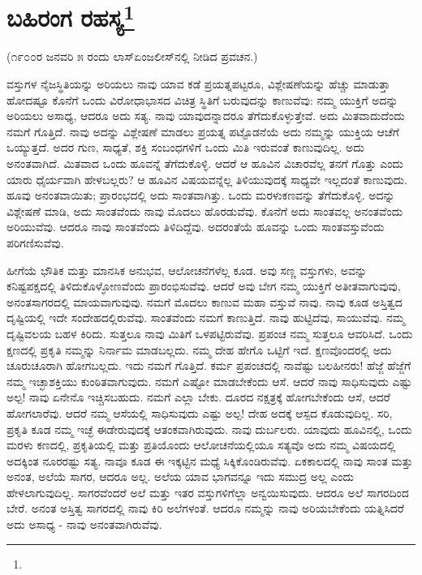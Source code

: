 
\chapter[ಬಹಿರಂಗ ರಹಸ್ಯ]{ಬಹಿರಂಗ ರಹಸ್ಯ\protect\footnote{}}

\begin{center}
(೧೯೦೦ರ ಜನವರಿ ೫ ರಂದು ಲಾಸ್‌ಏಂಜಲೀಸ್‌ನಲ್ಲಿ ನೀಡಿದ ಪ್ರವಚನ.)
\end{center}

ವಸ್ತುಗಳ ನೈಜಸ್ಥಿತಿಯನ್ನು ಅರಿಯಲು ನಾವು ಯಾವ ಕಡೆ ಪ್ರಯತ್ನಪಟ್ಟರೂ, ವಿಶ್ಲೇಷಣೆಯನ್ನು ಹೆಚ್ಚು ಮಾಡುತ್ತಾ ಹೋದಷ್ಟೂ ಕೊನೆಗೆ ಒಂದು ವಿರೋಧಾಭಾಸದ ವಿಚಿತ್ರ ಸ್ಥಿತಿಗೆ ಬರುವುದನ್ನು ಕಾಣುವೆವು: ನಮ್ಮ ಯುಕ್ತಿಗೆ ಅದನ್ನು ಅರಿಯಲು ಅಸಾಧ್ಯ, ಆದರೂ ಅದು ಸತ್ಯ. ನಾವು ಯಾವುದನ್ನಾದರೂ ತೆಗೆದುಕೊಳ್ಳುತ್ತೇವೆ. ಅದು ಮಿತವಾದುದೆಂದು ನಮಗೆ ಗೊತ್ತಿದೆ. ನಾವು ಅದನ್ನು ವಿಶ್ಲೇಷಣೆ ಮಾಡಲು ಪ್ರಯತ್ನ ಪಟ್ಟೊಡನೆಯೆ ಅದು ನಮ್ಮನ್ನು ಯುಕ್ತಿಯ ಆಚೆಗೆ ಒಯ್ಯುತ್ತದೆ. ಅದರ ಗುಣ, ಸಾಧ್ಯತೆ, ಶಕ್ತಿ ಸಂಬಂಧಗಳಿಗೆ ಒಂದು ಮಿತಿ ಇರುವಂತೆ ಕಾಣುವುದಿಲ್ಲ. ಅದು ಅನಂತವಾಗಿದೆ. ಮಿತವಾದ ಒಂದು ಹೂವನ್ನೆ ತೆಗೆದುಕೊಳ್ಳಿ. ಆದರೆ ಆ ಹೂವಿನ ವಿಚಾರವೆಲ್ಲ ತನಗೆ ಗೊತ್ತು ಎಂದು ಯಾರು ಧೈರ್ಯವಾಗಿ ಹೇಳಬಲ್ಲರು? ಆ ಹೂವಿನ ವಿಷಯವನ್ನೆಲ್ಲ ತಿಳಿಯುವುದಕ್ಕೆ ಸಾಧ್ಯವೇ ಇಲ್ಲದಂತೆ ಕಾಣುವುದು. ಹೂವು ಅನಂತವಾಯಿತು; ಪ್ರಾರಂಭದಲ್ಲಿ ಅದು ಸಾಂತವಾಗಿತ್ತು. ಒಂದು ಮರಳುಕಣವನ್ನು ತೆಗೆದುಕೊಳ್ಳಿ. ಅದನ್ನು ವಿಶ್ಲೇಷಣೆ ಮಾಡಿ, ಅದು ಸಾಂತವೆಂದು ನಾವು ಮೊದಲು ಹೊರಡುವೆವು. ಕೊನೆಗೆ ಅದು ಸಾಂತವಲ್ಲ ಅನಂತವೆಂದು ಅರಿಯುವೆವು. ಆದರೂ ನಾವು ಸಾಂತವೆಂದು ತಿಳಿದಿದ್ದೆವು. ಅದರಂತೆಯೆ ಹೂವನ್ನು ಒಂದು ಸಾಂತವಸ್ತುವೆಂದು ಪರಿಗಣಿಸುವೆವು.

ಹೀಗೆಯೆ ಭೌತಿಕ ಮತ್ತು ಮಾನಸಿಕ ಅನುಭವ, ಆಲೋಚನೆಗಳೆಲ್ಲ ಕೂಡ. ಅವು ಸಣ್ಣ ವಸ್ತುಗಳು, ಅವನ್ನು ಕನಿಷ್ಟಪಕ್ಷದಲ್ಲಿ ತಿಳಿದುಕೊಳ್ಳೋಣವೆಂದು ಪ್ರಾರಂಭಿಸುವೆವು. ಆದರೆ ಅವು ಬೇಗ ನಮ್ಮ ಯುಕ್ತಿಗೆ ಅತೀತವಾಗುವುವು, ಅನಂತಸಾಗರದಲ್ಲಿ ಮಾಯವಾಗುವುವು. ನಮಗೆ ಮೊದಲು ಕಾಣುವ ಮಹಾ ವಸ್ತುವೆ ನಾವು. ನಾವು ಕೂಡ ಅಸ್ತಿತ್ವದ ದೃಷ್ಟಿಯಲ್ಲಿ ಇದೇ ಸಂದೇಹದಲ್ಲಿರುವೆವು. ಸಾಂತವೆಂದು ನಮಗೆ ಕಾಣುತ್ತಿದೆ. ನಾವು ಹುಟ್ಟಿದೆವು, ಸಾಯುವೆವು. ನಮ್ಮ ದೃಷ್ಟಿವಲಯ ಬಹಳ ಕಿರಿದು. ಸುತ್ತಲೂ ನಾವು ಮಿತಿಗೆ ಒಳಪಟ್ಟಿರುವೆವು. ಪ್ರಪಂಚ ನಮ್ಮ ಸುತ್ತಲೂ ಆವರಿಸಿದೆ. ಒಂದು ಕ್ಷಣದಲ್ಲಿ ಪ್ರಕೃತಿ ನಮ್ಮನ್ನು ನಿರ್ನಾಮ ಮಾಡಬಲ್ಲದು. ನಮ್ಮ ದೇಹ ಹೇಗೊ ಒಟ್ಟಿಗೆ ಇದೆ. ಕ್ಷಣವೊಂದರಲ್ಲಿ ಅದು ಚೂರುಚೂರಾಗಿ ಹೋಗಬಲ್ಲದು. ಇದು ನಮಗೆ ಗೊತ್ತಿದೆ. ಕರ್ಮ ಪ್ರಪಂಚದಲ್ಲಿ ನಾವೆಷ್ಟು ಬಲಹೀನರು! ಹೆಜ್ಜೆ ಹೆಜ್ಜೆಗೆ ನಮ್ಮ ಇಚ್ಛಾಶಕ್ತಿಯು ಕುಂಠಿತವಾಗುವುದು. ನಮಗೆ ಎಷ್ಟೋ ಮಾಡಬೇಕೆಂದು ಆಸೆ. ಆದರೆ ನಾವು ಸಾಧಿಸುವುದು ಎಷ್ಟು ಅಲ್ಪ! ನಾವು ಏನೇನೊ ಇಚ್ಚಿಸಬಹುದು. ನಮಗೆ ಎಲ್ಲಾ ಬೇಕು. ದೂರದ ನಕ್ಷತ್ರಕ್ಕೆ ಹೋಗಬೇಕೆಂದು ಆಸೆ, ಆದರೆ ಹೋಗಲಾರೆವು. ಆದರೆ ನಮ್ಮ ಆಸೆಯಲ್ಲಿ ಸಾಧಿಸುವುದು ಎಷ್ಟು ಅಲ್ಪ! ದೇಹ ಅದಕ್ಕೆ ಆಸ್ಪದ ಕೊಡುವುದಿಲ್ಲ. ಸರಿ, ಪ್ರಕೃತಿ ಕೂಡ ನಮ್ಮ ಇಚ್ಛೆ ಈಡೇರುವುದಕ್ಕೆ ಆತಂಕವಾಗಿರುವುದು. ನಾವು ದುರ್ಬಲರು. ಯಾವುದು ಹೂವಿನಲ್ಲಿ, ಒಂದು ಮರಳು ಕಣದಲ್ಲಿ, ಪ್ರಕೃತಿಯಲ್ಲಿ ಮತ್ತು ಪ್ರತಿಯೊಂದು ಆಲೋಚನೆಯಲ್ಲಿಯೂ ಸತ್ಯವೊ ಅದು ನಮ್ಮ ವಿಷಯದಲ್ಲಿ ಅದಕ್ಕಿಂತ ನೂರರಷ್ಟು ಸತ್ಯ. ನಾವೂ ಕೂಡ ಈ ಇಕ್ಕಟ್ಟಿನ ಮಧ್ಯೆ ಸಿಕ್ಕಿಕೊಂಡಿರುವೆವು. ಏಕಕಾಲದಲ್ಲಿ ನಾವು ಸಾಂತ ಮತ್ತು ಅನಂತ, ಅಲೆಯೆ ಸಾಗರ, ಆದರೂ ಅಲ್ಲ. ಅಲೆಯ ಯಾವ ಭಾಗವನ್ನೂ ಇದು ಸಮುದ್ರ ಅಲ್ಲ ಎಂದು ಹೇಳಲಾಗುವುದಿಲ್ಲ. ಸಾಗರವೆಂದರೆ ಅಲೆ ಮತ್ತು ಇತರ ವಸ್ತುಗಳಿಗೆಲ್ಲಾ ಅನ್ವಯಿಸುವುದು. ಆದರೂ ಅಲೆ ಸಾಗರದಿಂದ ಬೇರೆ. ಅನಂತ ಅಸ್ತಿತ್ವ ಸಾಗರದಲ್ಲಿ ನಾವು ಕಿರಿ ಅಲೆಗಳಂತೆ. ಆದರೂ ನಮ್ಮನ್ನು ನಾವು ಅರಿಯಬೇಕೆಂದು ಯತ್ನಿಸಿದರೆ ಅದು ಅಸಾಧ್ಯ - ನಾವು ಅನಂತವಾಗಿರುವೆವು.

